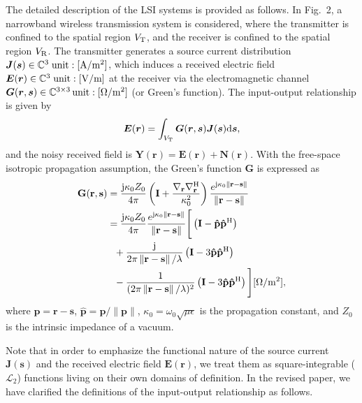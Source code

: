 \documentclass[a4paper,12pt]{article}
\begin{document}
{    \quad The detailed description of the LSI systems is provided as follows. In Fig.~2, a narrowband wireless transmission system is considered, where the transmitter is confined to the spatial region $V_{\rm T}$, and the receiver is confined to the spatial region $V_{\rm R}$. The transmitter generates a source current distribution ${\bm J}({\bm s})\in\mathbb{C}^3 \;{\rm unit:[A/m^2]}$, which induces a received electric field ${\bm E}({\bm r})\in\mathbb{C}^3\;{\rm unit:[V/m]}$ at the receiver via the electromagnetic channel ${\bm G}({\bm r}, {\bm s})\in\mathbb{C}^{3\times 3}\,{\rm unit:[\Omega/m^2]}$ (or Green's function). The input-output relationship is given by 
    \begin{equation}
        {\bm E}({\bm r})=\int_{V_{\rm T}} {\bm G}({\bm r}, {\bm s}){\bm J}({\bm s}){\rm d}{\bm s}, 
    \end{equation}
    and the noisy received field is ${\bm Y}({\bm r}) = {\bm E}({\bm r})+{\bm N}({\bm r})$. With the free-space isotropic propagation assumption, the Green's function ${\bm G}$ is expressed as 
    \begin{equation}
        \begin{aligned}
            {\bf{G}}({\bf{r}},{\bf{s}}) &= \frac{{\rm j}\kappa_0 {Z_0}}{{4\pi }} \left( {{\bf{I}} + \frac{{{\nabla _{\bf{r}}}\nabla _{\bf{r}}^{\rm{H}}}}{{{\kappa_0 ^2}}}} \right) \frac{{{e^{{\rm{j}}\kappa_0 \left\| {{\bf{r}} - {\bf{s}}} \right\|}}}}{{\left\| {{\bf{r}} - {\bf{s}}} \right\|}}  \\
            &= \frac{{\rm j}\kappa_0 {Z_0}}{{4\pi }}\frac{{{e^{{\rm{j}}\kappa_0 \left\| {{\bf{r}} - {\bf{s}}} \right\|}}}}{{\left\| {{\bf{r}} - {\bf{s}}} \right\|}}\Bigg[\left( {{\bf{I}} - {\bf{\hat p}}{{{\bf{\hat p}}}^{\rm{H}}}} \right) \\&~~+ \frac{{\rm j}}{2\pi \left\| {{\bf{r}} - {\bf{s}}} \right\| /\lambda}\left( {\bf I}-3{\bf{\hat p}}{{{\bf{\hat p}}}^{\rm{H}}} \right) \\&~~-\frac{1}{(2\pi\left\| {{\bf{r}} - {\bf{s}}} \right\|/\lambda )^2 }\left( {\bf I}-3{\bf{\hat p}}{{{\bf{\hat p}}}^{\rm{H}}}  \right) \Bigg] [{\rm \Omega}/{\rm m}^2], 
            \label{Green}
        \end{aligned}
    \end{equation}
    where ${\bm p}={\bm r}-{\bm s}$, $\hat{\bm p}={\bm p}/\|{\bm p}\|$, $\kappa_0=\omega_0\sqrt{\mu\epsilon}$ is the propagation constant, and $Z_0$ is the intrinsic impedance of a vacuum. 

    \quad Note that in order to emphasize the functional nature of the source current ${\bm J}({\bm s})$ and the received electric field ${\bm E}({\bm r})$, we treat them as square-integrable ($\mathcal{L}_2$) functions living on their own domains of definition.  In the revised paper, we have clarified the definitions of the input-output relationship as follows. 

}
\end{document}
